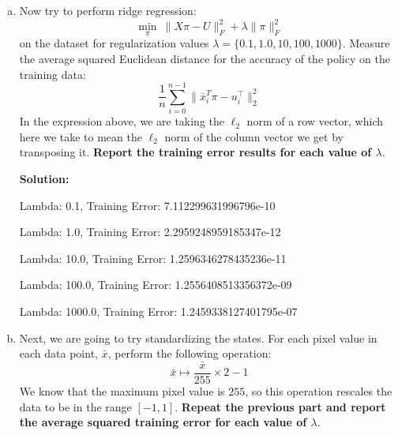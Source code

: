 \documentclass{article}
\newenvironment{solution}{\color{blue} \smallskip \textbf{Solution:}}{}
\begin{document}
\begin{enumerate}[(a)]
    \begin{solution}\\
        Error message:
        
        Linear algebra error during OLS:  Singular matrix
        
        OLS solution could not be computed due to a singular matrix.\\
        
        Explanation:
        
         If \( X^T X \) is not invertible, it means that the matrix is singular, often due to multicollinearity or insufficient training data. This is common when the number of features (2700) is greater than the number of training examples \( n \). In cases where \( n < 2700 \), there are fewer data points than the dimensionality of the flattened image space, which results in an underdetermined system. This makes it impossible to uniquely solve for \( \pi \) using ordinary least squares.

    \end{solution}

    \newpage
    \item Now try to perform ridge regression:
    \[\min_{\pi} \: \|X\pi - U\|_F^2 + \lambda \|\pi\|_F^2\]
    on the dataset for regularization values $\lambda = \lbrace 0.1, 1.0, 10, 100, 1000 \rbrace$. Measure the average squared Euclidean distance for the accuracy of the policy on the training data:
    \[\frac{1}{n}\sum_{i = 0}^{n-1} \|\bar{x}_i^T \pi - u_i^\top \|^2_2\] 
    In the expression above, we are taking the $\ell_2$ norm of a row vector, which here we take to mean the $\ell_2$ norm of the column vector we get by transposing it.
    \textbf{Report the training error results for each value of $\lambda$}.
    
    \begin{solution}
    
        Lambda: 0.1, Training Error: 7.112299631996796e-10
        
Lambda: 1.0, Training Error: 2.2959248959185347e-12

Lambda: 10.0, Training Error: 1.2596346278435236e-11

Lambda: 100.0, Training Error: 1.2556408513356372e-09

Lambda: 1000.0, Training Error: 1.2459338127401795e-07

    \end{solution}

    \newpage
    \item Next, we are going to try standardizing the states. For each pixel value in each data point, $\bar{x}$, perform the following operation: 
    \[\bar{x} \mapsto \frac{\bar{x}}{255} \times 2 - 1\]
    We know that the maximum pixel value is $255$, so this operation rescales the data to be in the range $[-1, 1]$.
    \textbf{Repeat the previous part and report the average squared training error for each value of $\lambda$}. \\
    

\end{enumerate}
\end{document}
